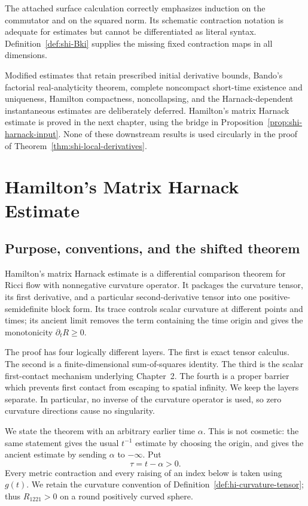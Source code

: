 \documentclass[10pt]{coll-l}
\theoremstyle{definition}
\theoremstyle{remark}
\numberwithin{section}{chapter}
\numberwithin{equation}{chapter}
\begin{document}
The attached surface calculation correctly emphasizes induction on the
commutator and on the squared norm.  Its schematic contraction notation is
adequate for estimates but cannot be differentiated as literal syntax.
Definition~\ref{def:shi-Bki} supplies the missing fixed contraction maps in
all dimensions.

Modified estimates that retain prescribed initial derivative bounds,
Bando's factorial real-analyticity theorem, complete noncompact
short-time existence and uniqueness, Hamilton compactness, noncollapsing,
and the Harnack-dependent instantaneous estimates are deliberately
deferred.  Hamilton's matrix Harnack estimate is proved in the next chapter,
using the bridge in Proposition~\ref{prop:shi-harnack-input}.  None of these
downstream results is used circularly in the proof of
Theorem~\ref{thm:shi-local-derivatives}.

\chapter{Hamilton's Matrix Harnack Estimate}
\label{ch:matrix-harnack}

\section{Purpose, conventions, and the shifted theorem}
\label{sec:harnack-purpose}

Hamilton's matrix Harnack estimate is a differential comparison theorem for
Ricci flow with nonnegative curvature operator.  It packages the curvature
tensor, its first derivative, and a particular second-derivative tensor into
one positive-semidefinite block form.  Its trace controls scalar curvature
at different points and times; its ancient limit removes the term containing
the time origin and gives the monotonicity $\partial_tR\geq0$.

The proof has four logically different layers.  The first is exact tensor
calculus.  The second is a finite-dimensional sum-of-squares identity.  The
third is the scalar first-contact mechanism underlying Chapter~2.  The
fourth is a proper barrier which prevents first contact from escaping to
spatial infinity.  We keep the layers separate.  In particular, no inverse
of the curvature operator is used, so zero curvature directions cause no
singularity.

We state the theorem with an arbitrary earlier time $\alpha$.  This is not
cosmetic: the same statement gives the usual $t^{-1}$ estimate by choosing
the origin, and gives the ancient estimate by sending $\alpha$ to
$-\infty$.  Put
\begin{equation}
                         \tau=t-\alpha>0.                 \label{eq:har-tau}
\end{equation}
Every metric contraction and every raising of an index below is taken using
$g(t)$.  We retain the curvature convention of
Definition~\ref{def:hi-curvature-tensor}; thus $R_{1221}>0$ on a round
positively curved sphere.
\end{document}
